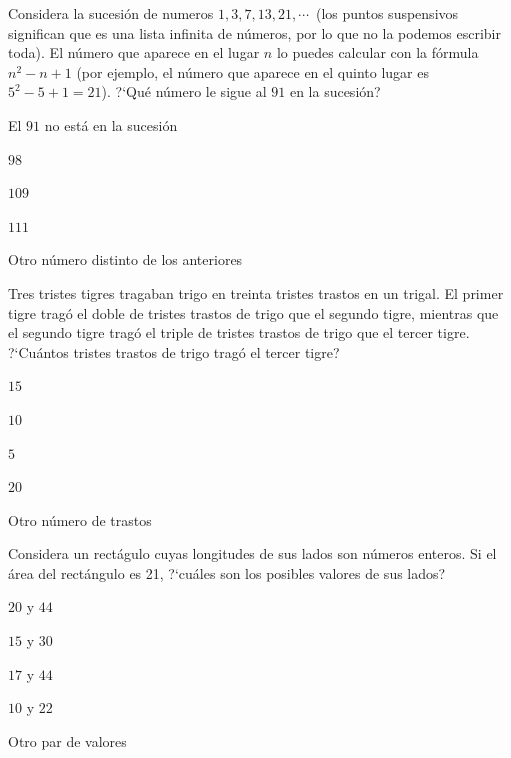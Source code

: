 \begin{Problema}{3}
  Considera la sucesi\'on de numeros $1, 3, 7, 13, 21, \cdots\,$ (los
  puntos suspensivos significan que es una lista infinita de
  n\'umeros, por lo que no la podemos escribir toda). El n\'umero que
  aparece en el lugar $n$ lo puedes calcular con la f\'ormula
  $n^2-n+1$ (por ejemplo, el n\'umero que aparece en el quinto lugar
  es $5^2-5+1=21$). ?`Qu\'e n\'umero le sigue al $91$ en la
  sucesi\'on?

  \begin{inparaenum}
  \item El $91$ no est\'a en la sucesi\'on \esp
  \item $98$ \esp
  \item $109$ \esp
  \item $111$ \esp 
  \item Otro n\'umero distinto de los anteriores 
\end{inparaenum}
\end{Problema}

\begin{Solucion}
  
\end{Solucion}

\begin{Problema}{4}
  Tres tristes tigres tragaban trigo en treinta tristes trastos en un
  trigal.  El primer tigre trag\'o el doble de tristes trastos de
  trigo que el segundo tigre, mientras que el segundo tigre trag\'o el
  triple de tristes trastos de trigo que el tercer tigre.  ?`Cu\'antos
  tristes trastos de trigo trag\'o el tercer tigre?

  \begin{inparaenum}
  \item $15$ \esp
  \item $10$ \esp
  \item $5$ \esp
  \item $20$ \esp
  \item Otro n\'umero de trastos
  \end{inparaenum}
\end{Problema}

\begin{Solucion}
  
\end{Solucion}

\begin{Problema}{5}
  Considera un rect\'agulo cuyas longitudes de sus lados son n\'umeros enteros. Si 
  el \'area del rect\'angulo es 21, ?`cu\'ales son los posibles valores de sus lados?

  \begin{inparaenum}
  \item $20$ y $44$ \quad\qquad
  \item $15$ y $30$ \quad\qquad
  \item $17$ y $44$ \quad\qquad
  \item $10$ y $22$ \quad\qquad
  \item Otro par de valores
  \end{inparaenum}
\end{Problema}

